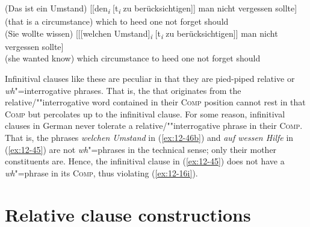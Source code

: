 \documentclass[output=paper]{langsci/langscibook}
\begin{document}
\begin{exe}
\ex
\label{ex:12-46}
\begin{xlist}
\ex
\label{ex:12-46a}
\gll
(Das ist ein Umstand) [[den\textsubscript{\textit{i}} [t\textsubscript{\textit{i}} zu berücksichtigen]] man nicht vergessen sollte] \\
(that is a circumstance) {\hphantom{[]}which} {} to heed one not forget should \\
\ex
\label{ex:12-46b}
\gll
(Sie wollte wissen) [[[welchen Umstand]\textsubscript{\textit{i}} [t\textsubscript{\textit{i}} zu berücksichtigen]] man nicht vergessen sollte] \\
(she wanted know) {\hphantom{[[]}which} circumstance {} to heed one not forget should \\
\end{xlist}
\end{exe}
Infinitival clauses like these are peculiar in that they are
pied-piped relative or \emph{wh}"=interrogative phrases. That is, the
 that originates from the relative/""interrogative
word contained in their \textsc{Comp} position cannot rest in that \textsc{Comp} but
percolates up to the infinitival clause.  For some reason, infinitival
clauses in German never tolerate a relative/""interrogative phrase in
their \textsc{Comp}. That is, the phrases \textit{welchen Umstand} in (\ref{ex:12-46b})
and \textit{auf wessen Hilfe} in (\ref{ex:12-45}) are not \emph{wh}"=phrases in the
technical sense; only their mother constituents are. Hence, the
infinitival clause in (\ref{ex:12-45}) does not have a \emph{wh}"=phrase in its
\textsc{Comp}, thus violating (\ref{ex:12-16i}).

\section{Relative clause constructions}
\label{sec:12-11}
\end{document}
